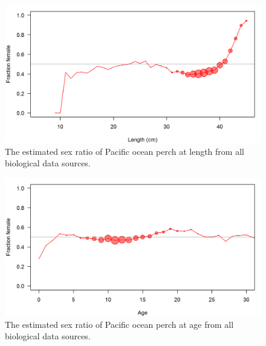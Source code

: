 \documentclass[12pt,]{article}
\begin{document}
\FloatBarrier

\begin{figure}
\centering
\includegraphics{Figures/allSexRatios.png}
\caption{The estimated sex ratio of Pacific ocean perch at length from
all biological data sources. \label{fig:sexratio}}
\end{figure}

\begin{figure}
\centering
\includegraphics{Figures/allSexRatiosAge.png}
\caption{The estimated sex ratio of Pacific ocean perch at age from all
biological data sources. \label{fig:sexratio_Age}}
\end{figure}
\end{document}
